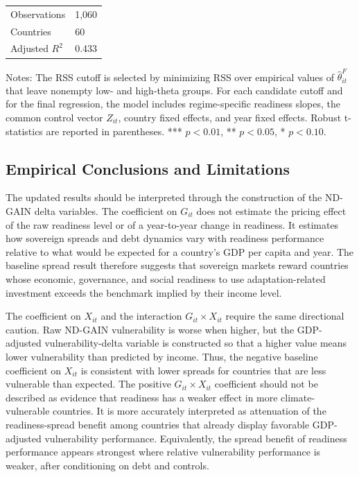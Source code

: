 \documentclass[11pt]{article}
\theoremstyle{definition}
\begin{document}
\begin{table}[H]
\begin{threeparttable}
\begin{tabularx}{\textwidth}{lY}
Observations & 1,060 \\
Countries & 60 \\
Adjusted $R^2$ & 0.433 \\
\bottomrule
\end{tabularx}
\begin{tablenotes}[flushleft]\footnotesize
\item Notes: The RSS cutoff is selected by minimizing RSS over empirical values of $\widehat{\theta}^{F}_{it}$ that leave nonempty low- and high-theta groups. For each candidate cutoff and for the final regression, the model includes regime-specific readiness slopes, the common control vector $Z_{it}$, country fixed effects, and year fixed effects. Robust t-statistics are reported in parentheses. *** $p<0.01$, ** $p<0.05$, * $p<0.10$.
\end{tablenotes}
\end{threeparttable}
\end{table}

\subsection{Empirical Conclusions and Limitations}

The updated results should be interpreted through the construction of the ND-GAIN delta variables. The coefficient on $G_{it}$ does not estimate the pricing effect of the raw readiness level or of a year-to-year change in readiness. It estimates how sovereign spreads and debt dynamics vary with readiness performance relative to what would be expected for a country's GDP per capita and year. The baseline spread result therefore suggests that sovereign markets reward countries whose economic, governance, and social readiness to use adaptation-related investment exceeds the benchmark implied by their income level.

The coefficient on $X_{it}$ and the interaction $G_{it}\times X_{it}$ require the same directional caution. Raw ND-GAIN vulnerability is worse when higher, but the GDP-adjusted vulnerability-delta variable is constructed so that a higher value means lower vulnerability than predicted by income. Thus, the negative baseline coefficient on $X_{it}$ is consistent with lower spreads for countries that are less vulnerable than expected. The positive $G_{it}\times X_{it}$ coefficient should not be described as evidence that readiness has a weaker effect in more climate-vulnerable countries. It is more accurately interpreted as attenuation of the readiness-spread benefit among countries that already display favorable GDP-adjusted vulnerability performance. Equivalently, the spread benefit of readiness performance appears strongest where relative vulnerability performance is weaker, after conditioning on debt and controls.
\end{document}
